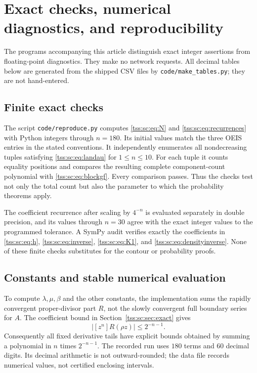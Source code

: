 \documentclass[11pt]{article}
\theoremstyle{remark}\newtheorem{remark}[theorem]{Remark}
\theoremstyle{definition}\newtheorem{definition}[theorem]{Definition}
\begin{document}
\section{Exact checks, numerical diagnostics, and reproducibility}
\label{tss:sc:sec:checks}

The programs accompanying this article distinguish exact integer assertions from floating-point diagnostics. They make no network requests. All decimal tables below are generated from the shipped CSV files by \texttt{code/make\_tables.py}; they are not hand-entered.

\subsection{Finite exact checks}
The script \texttt{code/reproduce.py} computes \eqref{tss:sc:eq:N} and \eqref{tss:sc:eq:recurrences} with Python integers through $n=180$. Its initial values match the three OEIS entries in the stated conventions. It independently enumerates all nondecreasing tuples satisfying \eqref{tss:sc:eq:landau} for $1\leq n\leq10$. For each tuple it counts equality positions and compares the resulting complete component-count polynomial with \eqref{tss:sc:eq:blockgf}. Every comparison passes. Thus the checks test not only the total count but also the parameter to which the probability theorems apply.

The coefficient recurrence after scaling by $4^{-n}$ is evaluated separately in double precision, and its values through $n=30$ agree with the exact integer values to the programmed tolerance. A SymPy audit verifies exactly the coefficients in \eqref{tss:sc:eq:h}, \eqref{tss:sc:eq:inverse}, \eqref{tss:sc:eq:K1}, and \eqref{tss:sc:eq:densityinverse}. None of these finite checks substitutes for the contour or probability proofs.

\subsection{Constants and stable numerical evaluation}
To compute $\lambda,\mu,\beta$ and the other constants, the implementation sums the rapidly convergent proper-divisor part $R$, not the slowly convergent full boundary series for $A$. The coefficient bound in Section~\ref{tss:sc:sec:exact} gives
\[
 |[z^n]R(\rho z)|\leq2^{-n-1}.
\]
Consequently all fixed derivative tails have explicit bounds obtained by summing a polynomial in $n$ times $2^{-n-1}$. The recorded run uses $180$ terms and $60$ decimal digits. Its decimal arithmetic is not outward-rounded; the data file records numerical values, not certified enclosing intervals.
\end{document}
